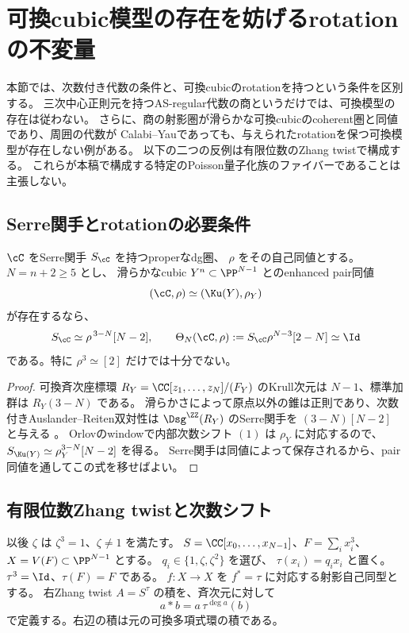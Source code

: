 \section{可換cubic模型の存在を妨げるrotationの不変量}
\label{sec:rotation-obstruction}

本節では、次数付き代数の条件と、可換cubicのrotationを持つという条件を区別する。
三次中心正則元を持つAS-regular代数の商というだけでは、可換模型の存在は従わない。
さらに、商の射影圏が滑らかな可換cubicのcoherent圏と同値であり、周囲の代数が
Calabi--Yauであっても、与えられたrotationを保つ可換模型が存在しない例がある。
以下の二つの反例は有限位数のZhang twistで構成する。
これらが本稿で構成する特定のPoisson量子化族のファイバーであることは主張しない。

\subsection{Serre関手とrotationの必要条件}

\begin{proposition}
\label{prop:serre-rotation-obstruction}
 \(\cC\) をSerre関手 \(S_{\cC}\) を持つproperなdg圏、
 \(\rho\) をその自己同値とする。\(N=n+2\ge5\) とし、
 滑らかなcubic \(Y^n\subset\PP^{N-1}\) とのenhanced pair同値
 \[
 (\cC,\rho)\simeq(\Ku(Y),\rho_Y)
 \]
 が存在するなら、
 \begin{equation}\label{eq:serre-rotation-necessary}
 S_{\cC}\simeq\rho^{\,3-N}[N-2],\qquad
 \Theta_N(\cC,\rho):=S_{\cC}\rho^{N-3}[2-N]\simeq\Id
 \end{equation}
 である。特に \(\rho^3\simeq[2]\) だけでは十分でない。
\end{proposition}
\begin{proof}
 可換斉次座標環 \(R_Y=\CC[z_1,\ldots,z_N]/(F_Y)\) のKrull次元は
 \(N-1\)、標準加群は \(R_Y(3-N)\) である。
 滑らかさによって原点以外の錐は正則であり、次数付きAuslander--Reiten双対性は
 \(\Dsg^{\ZZ}(R_Y)\) のSerre関手を
 \((3-N)[N-2]\) と与える
 \cite[Theorem 7, p.~161]{UeyamaIsolated}。
 Orlovのwindowで内部次数シフト \((1)\) は \(\rho_Y\) に対応するので、
 \(S_{\Ku(Y)}\simeq\rho_Y^{3-N}[N-2]\) を得る。
 Serre関手は同値によって保存されるから、pair同値を通してこの式を移せばよい。
\end{proof}

\subsection{有限位数Zhang twistと次数シフト}

以後 \(\zeta\) は \(\zeta^3=1\)、\(\zeta\ne1\) を満たす。
\(S=\CC[x_0,\ldots,x_{N-1}]\)、\(F=\sum_i x_i^3\)、
\(X=V(F)\subset\PP^{N-1}\) とする。
\(q_i\in\{1,\zeta,\zeta^2\}\) を選び、
\(\tau(x_i)=q_i x_i\) と置く。\(\tau^3=\Id\)、\(\tau(F)=F\) である。
\(f:X\to X\) を \(f^*=\tau\) に対応する射影自己同型とする。
右Zhang twist \(A=S^{\tau}\) の積を、斉次元に対して
\begin{equation}\label{eq:right-zhang-product}
 a*b=a\,\tau^{\deg a}(b)
\end{equation}
で定義する。右辺の積は元の可換多項式環の積である。

